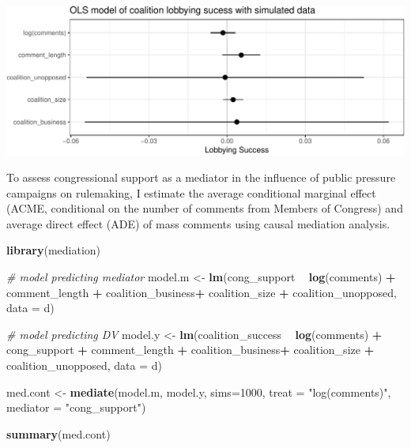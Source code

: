 \documentclass[
      12pt,
        ]{article}
\newenvironment{Shaded}{\begin{snugshade}}{\end{snugshade}}
\newcommand{\CommentTok}[1]{\textcolor[rgb]{0.56,0.35,0.01}{\textit{#1}}}
\newcommand{\DataTypeTok}[1]{\textcolor[rgb]{0.13,0.29,0.53}{#1}}
\newcommand{\DecValTok}[1]{\textcolor[rgb]{0.00,0.00,0.81}{#1}}
\newcommand{\KeywordTok}[1]{\textcolor[rgb]{0.13,0.29,0.53}{\textbf{#1}}}
\newcommand{\NormalTok}[1]{#1}
\newcommand{\OperatorTok}[1]{\textcolor[rgb]{0.81,0.36,0.00}{\textbf{#1}}}
\newcommand{\StringTok}[1]{\textcolor[rgb]{0.31,0.60,0.02}{#1}}
\begin{document}
\includegraphics{Figs/model_success_plot-1.pdf}

To assess congressional support as a mediator in the influence of public pressure campaigns on rulemaking, I estimate the average conditional marginal effect (ACME, conditional on the number of comments from Members of Congress) and average direct effect (ADE) of mass comments using causal mediation analysis.

\begin{Shaded}
\begin{Highlighting}[]
\KeywordTok{library}\NormalTok{(mediation)}

\CommentTok{# model predicting mediator}
\NormalTok{model.m <-}\StringTok{ }\KeywordTok{lm}\NormalTok{(cong_support }\OperatorTok{~}\StringTok{  }\KeywordTok{log}\NormalTok{(comments) }\OperatorTok{+}\StringTok{ }\NormalTok{comment_length }\OperatorTok{+}\StringTok{ }\NormalTok{coalition_business}\OperatorTok{+}\StringTok{  }\NormalTok{coalition_size }\OperatorTok{+}\StringTok{ }\NormalTok{coalition_unopposed, }\DataTypeTok{data =}\NormalTok{ d) }

\CommentTok{# model predicting DV}
\NormalTok{model.y <-}\StringTok{ }\KeywordTok{lm}\NormalTok{(coalition_success }\OperatorTok{~}\StringTok{ }\KeywordTok{log}\NormalTok{(comments) }\OperatorTok{+}\StringTok{ }\NormalTok{cong_support }\OperatorTok{+}\StringTok{ }\NormalTok{comment_length }\OperatorTok{+}\StringTok{ }\NormalTok{coalition_business}\OperatorTok{+}\StringTok{  }\NormalTok{coalition_size }\OperatorTok{+}\StringTok{ }\NormalTok{coalition_unopposed, }\DataTypeTok{data =}\NormalTok{ d) }

\NormalTok{med.cont <-}\StringTok{ }\KeywordTok{mediate}\NormalTok{(model.m, model.y, }\DataTypeTok{sims=}\DecValTok{1000}\NormalTok{, }\DataTypeTok{treat =} \StringTok{"log(comments)"}\NormalTok{,}
\DataTypeTok{mediator =} \StringTok{"cong_support"}\NormalTok{)}

\KeywordTok{summary}\NormalTok{(med.cont)}
\end{Highlighting}
\end{Shaded}
\end{document}
